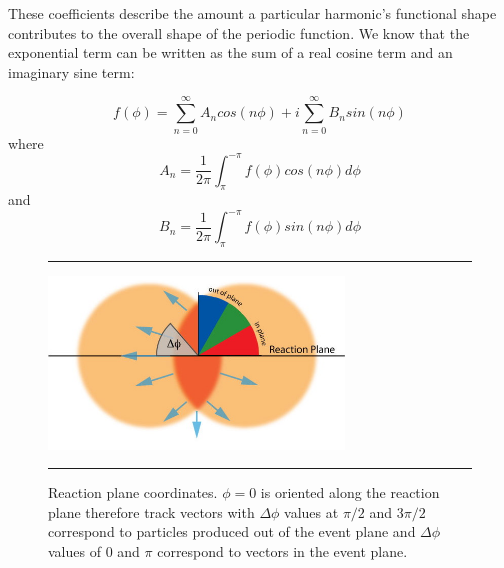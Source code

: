These coefficients describe the amount a particular harmonic's functional shape contributes to the overall shape of the periodic function. We know that the exponential term can be written as the sum of a real cosine term and an imaginary sine term:

\begin{equation}
f(\phi) = \sum^{\infty}_{n=0} A_{n} cos ( n \phi) + i \sum^{\infty}_{n=0} B_{n} sin (n \phi)
\end{equation}
where
\begin{equation}
A_{n} = \frac{1}{2\pi} \int^{-\pi}_{\pi} f(\phi) cos (n \phi) d\phi
\end{equation}
and
\begin{equation}
B_{n} = \frac{1}{2\pi} \int^{-\pi}_{\pi} f(\phi) sin (n \phi) d\phi 
\end{equation}

\begin{figure}[htbp!]
  \centering
  \rule{35em}{0.5pt}
    \includegraphics[width=0.7\textwidth]{Figures/RP_InOutPlane_3.jpg}
        
  \caption[Reaction plane coordinates.]{Reaction plane coordinates. $\phi = 0$ is oriented along the reaction plane therefore track vectors with $\Delta\phi$ values at $\pi/2$ and $3 \pi / 2$ correspond to particles produced out of the event plane and $\Delta\phi$ values of $0$ and $\pi$ correspond to vectors in the event plane.}
  \rule{35em}{0.5pt}
  \label{fig:dphiep}
\end{figure}


